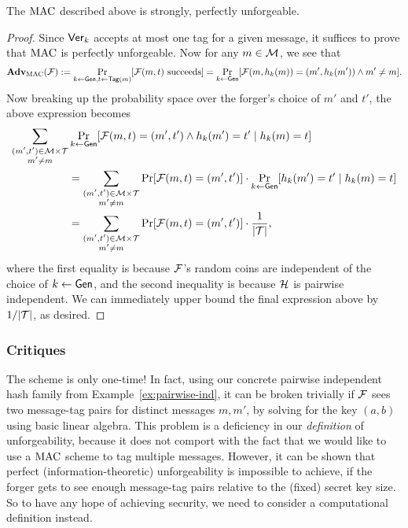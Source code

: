 \documentclass[11pt]{article}
\begin{document}
\begin{theorem}
  \label{thm:pwise-unforgeable}
  The $\text{MAC}$ described above is strongly, perfectly unforgeable.
\end{theorem}

\begin{proof}
  Since $\mathsf{Ver}_{k}$ accepts at most one tag for a given message, it
  suffices to prove that $\text{MAC}$ is perfectly unforgeable.  Now for any
  $m \in \mathcal{M}$, we see that
  \[
  \mathbf{Adv}_{\text{MAC}}(\mathcal{F}) := \Pr_{k \gets \mathsf{Gen}, t \gets
    \mathsf{Tag}(m)}[\mathcal{F}(m, t) \text{ succeeds}] = \Pr_{k \gets
    \mathsf{Gen}}[\mathcal{F}(m, h_k(m)) = (m', h_k(m')) \wedge m' \neq m].
  \]
  Now breaking up the probability space over the forger's choice of
  $m'$ and $t'$, the above expression becomes
  \begin{align*}
    \sum_{\substack{(m',t') \in \mathcal{M} \times \mathcal{T} \\ m' \neq
        m}} &\Pr_{k \gets \mathsf{Gen}}[\mathcal{F}(m, t) = (m',t') \wedge
    h_{k}(m')=t' \mid h_{k}(m) = t] \\
    & = \sum_{\substack{(m',t') \in \mathcal{M} \times \mathcal{T} \\
        m' \neq m}} \Pr[\mathcal{F}(m, t) = (m',t')] \cdot \Pr_{k \gets
      \mathsf{Gen}}[h_k(m') = t' \mid h_{k}(m) = t] \\
    & = \sum_{\substack{(m',t') \in \mathcal{M} \times \mathcal{T} \\
        m' \neq m}} \Pr[\mathcal{F}(m, t) = (m',t')] \cdot
    \frac{1}{|\mathcal{T}|},
  \end{align*}
  where the first equality is because $\mathcal{F}$'s random coins are
  independent of the choice of $k \gets \mathsf{Gen}$, and the second
  inequality is because $\mathcal{H}$ is pairwise independent.  We can
  immediately upper bound the final expression above by
  $1/\lvert\mathcal{T}\rvert$, as desired.
\end{proof}

\subsubsection{Critiques}
\label{sec:critiques-info-mac}

The scheme is only one-time!  In fact, using our concrete pairwise
independent hash family from Example~\ref{ex:pairwise-ind}, it can be
broken trivially if $\mathcal{F}$ sees two message-tag pairs for distinct
messages $m,m'$, by solving for the key $(a,b)$ using basic linear
algebra.  This problem is a deficiency in our \emph{definition} of
unforgeability, because it does not comport with the fact that we
would like to use a $\text{MAC}$ scheme to tag multiple messages.  However,
it can be shown that perfect (information-theoretic) unforgeability is
impossible to achieve, if the forger gets to see enough message-tag
pairs relative to the (fixed) secret key size.  So to have any hope of
achieving security, we need to consider a computational definition
instead.
\end{document}
